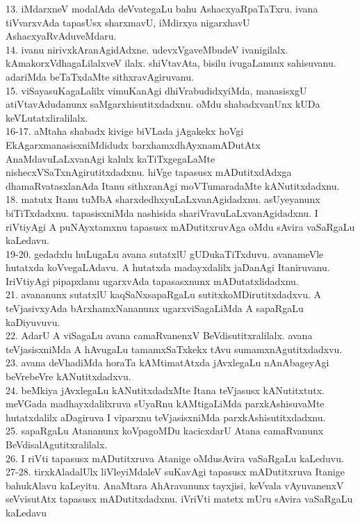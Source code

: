 \documentclass{article}
\begin{document}
13. iMdarxneV modalAda deVvategaLu bahu AshacxyaRpaTaTxru. ivana tiVvarxvAda tapasUsx sharxmavU, iMdirxya nigarxhavU AshacxyaRvAduveMdaru.\\
14. ivanu nirivxkAranAgidAdxne. udevxVgaveMbudeV ivanigilalx. kAmakorxVdhagaLilalxveV ilalx. shiVtavAta, bisilu ivugaLanunx sahisuvanu. adariMda beTaTxdaMte sithxravAgiruvanu.\\
15. viSayasuKagaLalilx vimuKanAgi dhiVrabudidxyiMda, manasisxgU atiVtavAdudanunx saMgarxhisutitxdadxnu. oMdu shabadxvanUnx kUDa keVLutatxliralilalx.\\
16-17. aMtaha shabadx kivige biVLada jAgakekx hoVgi EkAgarxmanasisxniMdidudx barxhamxdhAyxnamADutAtx AnaMdavuLaLxvanAgi kalulx kaTiTxgegaLaMte nishecxVSaTxnAgirutitxdadxnu. hiVge tapasusx mADutitxdAdxga dhamaRvatasxlanAda Itanu sithxranAgi moVTumaradaMte kANutitxdadxnu.\\
18. matutx Itanu tuMbA sharxdedhxyuLaLxvanAgidadxnu. asUyeyanunx biTiTxdadxnu. tapasisxniMda nashisida shariVravuLaLxvanAgidadxnu. I riVtiyAgi A puNAyxtamxnu tapasusx mADutitxruvAga oMdu sAvira vaSaRgaLu kaLedavu.\\
19-20. gedadxlu huLugaLu avana sutatxlU gUDukaTiTxduvu. avanameVle hutatxda koVvegaLAdavu. A hutatxda madayxdalilx jaDanAgi Itaniruvanu. IriVtiyAgi pipapxlanu ugarxvAda tapasasxnunx mADutatxlidadxnu.\\
21. avananunx sutatxlU kaqSaNxsapaRgaLu sutitxkoMDirutitxdadxvu. A teVjasivxyAda bArxhamxNananunx ugarxviSagaLiMda A sapaRgaLu kaDiyuvuvu.\\
22. AdarU A viSagaLu avana camaRvanenxV BeVdisutitxralilalx. avana teVjasisxniMda A hAvugaLu tamamxSaTxkekx tAvu sumamxnAgutitxdadxvu.\\
23. avana deVhadiMda horaTa kAMtimatAtxda jAvxlegaLu nAnAbageyAgi beVrebeVre kANutitxdadxvu.\\
24. beMkiya jAvxlegaLu kANutitxdadxMte Itana teVjasusx kANutitxtutx. meVGada madhayxdalilxruva sUyaRnu kAMtigaLiMda parxkAshisuvaMte hutatxdalilx aDagiruva I viparxnu teVjasisxniMda parxkAshisutitxdadxnu.\\
25. sapaRgaLu Atananunx koVpagoMDu kacicxdarU Atana camaRvanunx BeVdisalAgutitxralilalx.\\
26. I riVti tapasusx mADutitxruva Atanige oMdusAvira vaSaRgaLu kaLeduvu.\\
27-28. tirxkAladalUlx liVleyiMdaleV suKavAgi tapasusx mADutitxruva Itanige bahukAlavu kaLeyitu. AnaMtara AhAravanunx tayxjisi, keVvala vAyuvanenxV seVvisutAtx tapasusx mADutitxdadxnu. iVriVti matetx mUru sAvira vaSaRgaLu kaLedavu\\
\end{document}
